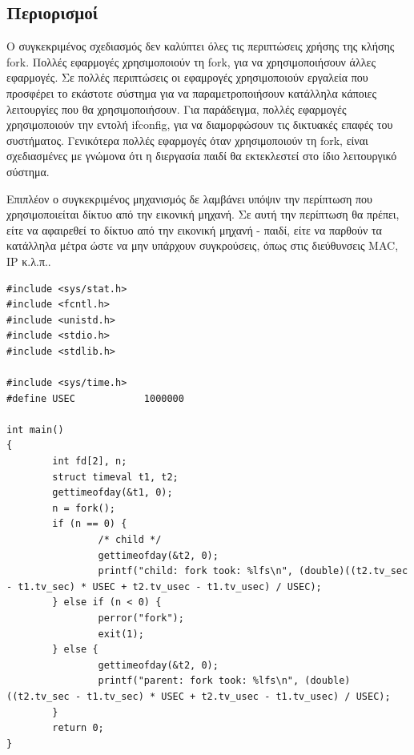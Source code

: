 \subsection{Περιορισμοί}
Ο συγκεκριμένος σχεδιασμός δεν καλύπτει όλες τις περιπτώσεις χρήσης της κλήσης
fork. Πολλές εφαρμογές χρησιμοποιούν τη fork, για να χρησιμοποιήσουν άλλες
εφαρμογές. Σε πολλές περιπτώσεις οι εφαμρογές χρησιμοποιούν εργαλεία που
προσφέρει το εκάστοτε σύστημα για να παραμετροποιήσουν κατάλληλα κάποιες
λειτουργίες που θα χρησιμοποιήσουν. Για παράδειγμα, πολλές εφαρμογές
χρησιμοποιούν την εντολή ifconfig, για να διαμορφώσουν τις δικτυακές επαφές του
συστήματος. Γενικότερα πολλές εφαρμογές όταν χρησιμοποιούν τη fork, είναι
σχεδιασμένες με γνώμονα ότι η διεργασία παιδί θα εκτεκλεστεί στο ίδιο
λειτουργικό σύστημα.

Επιπλέον ο συγκεκριμένος μηχανισμός δε λαμβάνει υπόψιν την περίπτωση
που χρησιμοποιείται δίκτυο από την εικονική μηχανή. Σε αυτή την περίπτωση θα
πρέπει, είτε να αφαιρεθεί το δίκτυο από την εικονική μηχανή - παιδί, είτε να
παρθούν τα κατάλληλα μέτρα ώστε να μην υπάρχουν συγκρούσεις, όπως στις
διεύθυνσεις MAC, IP κ.λ.π.. 

\begin{lstlisting}[label={time_test}]
#include <sys/stat.h>
#include <fcntl.h>
#include <unistd.h>
#include <stdio.h>
#include <stdlib.h>

#include <sys/time.h>
#define USEC            1000000

int main()
{
        int fd[2], n;
        struct timeval t1, t2;
        gettimeofday(&t1, 0);
        n = fork();
        if (n == 0) {
                /* child */
                gettimeofday(&t2, 0);
                printf("child: fork took: %lfs\n", (double)((t2.tv_sec - t1.tv_sec) * USEC + t2.tv_usec - t1.tv_usec) / USEC);
        } else if (n < 0) {
                perror("fork");
                exit(1);
        } else {
                gettimeofday(&t2, 0);
                printf("parent: fork took: %lfs\n", (double)((t2.tv_sec - t1.tv_sec) * USEC + t2.tv_usec - t1.tv_usec) / USEC);
        }
        return 0;
}

\end{lstlisting}
